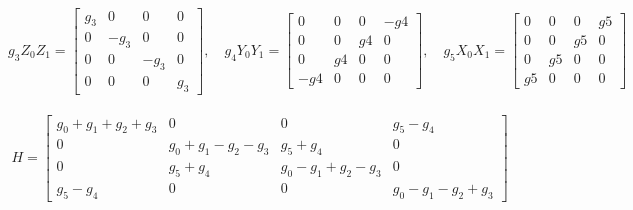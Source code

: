\documentclass{article}
\begin{document}
\\
\[
	g_3 Z_0 Z_1 = \begin{bmatrix}
		g_3 & 0    & 0    & 0   \\
		0   & -g_3 & 0    & 0   \\
		0   & 0    & -g_3 & 0   \\
		0   & 0    & 0    & g_3
	\end{bmatrix}, \quad
	g_4 Y_0 Y_1 = \begin{bmatrix}
		0   & 0  & 0  & -g4 \\
		0   & 0  & g4 & 0   \\
		0   & g4 & 0  & 0   \\
		-g4 & 0  & 0  & 0
	\end{bmatrix}, \quad
	g_5 X_0 X_1 = \begin{bmatrix}
		0  & 0  & 0  & g5 \\
		0  & 0  & g5 & 0  \\
		0  & g5 & 0  & 0  \\
		g5 & 0  & 0  & 0
	\end{bmatrix}
\]
\\
\[
	H = \begin{bmatrix}
		g_0 + g_1 + g_2 + g_3 & 0                     & 0                     & g_5 - g_4              \\
		0                     & g_0 + g_1 - g_2 - g_3 & g_5 + g_4             & 0                      \\
		0                     & g_5 + g_4             & g_0 - g_1 + g_2 - g_3 & 0                      \\
		g_5 - g_4             & 0                     & 0                     & g_0 - g_1 - g_2 +  g_3
	\end{bmatrix}
\]
\end{document}
